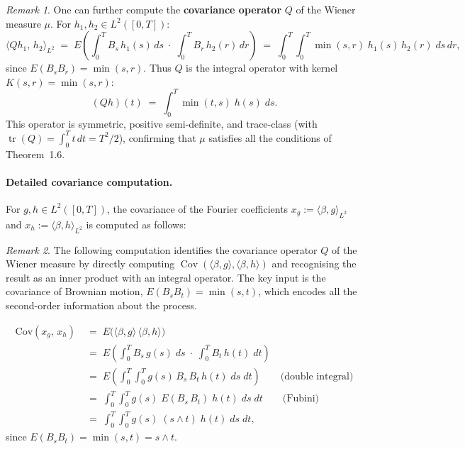 \documentclass[11pt]{article}
\theoremstyle{definition}
\theoremstyle{remark}
\newtheorem{remark}{Remark}
\DeclareMathOperator{\tr}{tr}
\begin{document}
\begin{remark}
One can further compute the \textbf{covariance operator} $Q$ of
the Wiener measure $\mu$.  For $h_1, h_2 \in L^2([0,T])$:
\[
    \langle Q h_1,\, h_2 \rangle_{L^2}
    \;=\;
    E\!\left(\int_0^T B_s\,h_1(s)\,ds
    \;\cdot\;
    \int_0^T B_r\,h_2(r)\,dr\right)
    \;=\;
    \int_0^T\!\!\int_0^T
    \min(s,r)\;h_1(s)\,h_2(r)\;ds\,dr,
\]
since $E(B_s B_r) = \min(s, r)$.  Thus $Q$ is the integral operator
with kernel $K(s,r) = \min(s,r)$:
\[
    (Qh)(t)
    \;=\;
    \int_0^T \min(t,s)\;h(s)\;ds.
\]
This operator is symmetric, positive semi-definite, and trace-class
(with $\tr(Q) = \int_0^T t\,dt = T^2/2$), confirming that $\mu$
satisfies all the conditions of Theorem~1.6.
\end{remark}

\paragraph{Detailed covariance computation.}

For $g, h \in L^2([0,T])$, the covariance of the Fourier
coefficients $x_g := \langle \beta, g\rangle_{L^2}$ and
$x_h := \langle \beta, h\rangle_{L^2}$ is computed as follows:

\begin{remark}
The following computation identifies the covariance operator $Q$ of the Wiener measure by directly computing $\operatorname{Cov}(\langle \beta, g\rangle, \langle \beta, h\rangle)$ and recognising the result as an inner product with an integral operator.  The key input is the covariance of Brownian motion, $E(B_s B_t) = \min(s,t)$, which encodes all the second-order information about the process.
\end{remark}
\begin{align*}
    \mathrm{Cov}(x_g,\, x_h)
    &\;=\;
    E\!\bigl(\langle \beta, g \rangle\,\langle \beta, h \rangle\bigr) \\[6pt]
    &\;=\;
    E\!\left(
        \int_0^T B_s\,g(s)\;ds
        \;\cdot\;
        \int_0^T B_t\,h(t)\;dt
    \right) \\[6pt]
    &\;=\;
    E\!\left(
        \int_0^T\!\!\int_0^T
        g(s)\,B_s\,B_t\,h(t)\;ds\;dt
    \right)
    \qquad \text{(double integral)} \\[6pt]
    &\;=\;
    \int_0^T\!\!\int_0^T
    g(s)\;E(B_s\,B_t)\;h(t)\;ds\;dt
    \qquad \text{(Fubini)} \\[6pt]
    &\;=\;
    \int_0^T\!\!\int_0^T
    g(s)\;(s \wedge t)\;h(t)\;ds\;dt,
\end{align*}
since $E(B_s B_t) = \min(s,t) = s \wedge t$.
\end{document}
